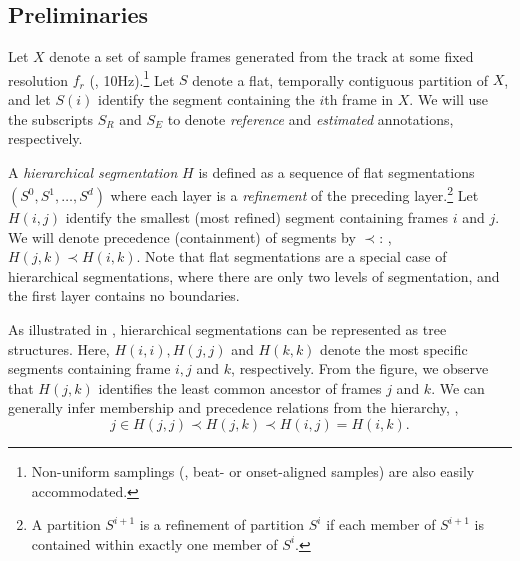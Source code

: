\documentclass{article}
\begin{document}
\subsection{Preliminaries}


Let $X$ denote a set of sample frames generated from the track at some fixed resolution $f_r$ (\eg,
10Hz).\footnote{Non-uniform samplings (\eg, beat- or onset-aligned samples) are also easily accommodated.}
Let $S $ denote a flat, temporally contiguous partition of $X$,
and let $S(i)$ identify the segment containing the $i$th frame in $X$.
We will use the subscripts $S_R$ and $S_E$ to denote \emph{reference} and \emph{estimated} annotations, respectively.

A \emph{hierarchical segmentation} $H$ is defined as a sequence of flat segmentations $(S^0, S^1, \dots, S^d)$ where each layer is a \emph{refinement}
of the preceding layer.\footnote{A partition $S^{i+1}$ is a refinement of partition $S^{i}$ if each member of $S^{i+1}$ is contained within exactly one member of $S^i$.}
Let $H(i,j)$ identify the smallest (most refined) segment containing frames $i$ and $j$.
We will denote precedence (containment) of segments by $\prec$: \eg, $H(j, k) \prec H(i, k)$.
Note that flat segmentations are a special case of hierarchical segmentations, where there are only two
levels of segmentation, and the first layer contains no boundaries.

As illustrated in , hierarchical segmentations can be represented as tree structures.
Here, $H(i, i), H(j, j)$ and $H(k,k)$ denote the most specific segments containing frame $i, j$ and $k$,
respectively.
From the figure, we observe that $H(j,k)$ identifies the least common ancestor of frames $j$ and $k$.
We can generally infer membership and precedence relations from the hierarchy, \eg,
\begin{equation}
j \in H(j, j) \prec H(j, k) \prec H(i, j) = H(i, k).
\end{equation}
\end{document}
